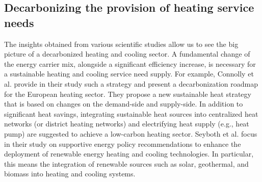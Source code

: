 \subsection{Decarbonizing the provision of heating service needs}\label{aspect1}
The insights obtained from various scientific studies allow us to see the big picture of a decarbonized heating and cooling sector. A fundamental change of the energy carrier mix, alongside a significant efficiency increase, is necessary for a sustainable heating and cooling service need supply. For example, Connolly et al. \cite{connolly2014heat} provide in their study such a strategy and present a decarbonization roadmap for the European heating sector. They propose a new sustainable heat strategy that is based on changes on the demand-side and supply-side. In addition to significant heat savings, integrating sustainable heat sources into centralized heat networks (or district heating networks) and electrifying heat supply (e.g., heat pump) are suggested to achieve a low-carbon heating sector. Seyboth et al. \cite{seyboth2008recognising} focus in their study on supportive energy policy recommendations to enhance the deployment of renewable energy heating and cooling technologies. In particular, this means the integration of renewable sources such as solar, geothermal, and biomass into heating and cooling systems.\vspace{0.5cm}

